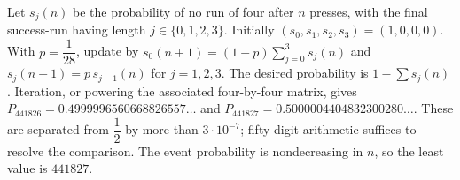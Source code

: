 Let $s_j(n)$ be the probability of no run of four after $n$ presses, with the final success-run having length $j\in\{0,1,2,3\}$. Initially $(s_0,s_1,s_2,s_3)=(1,0,0,0)$. With $p=\dfrac{1}{28}$, update by $s_0(n+1)=(1-p)\sum_{j=0}^3s_j(n)$ and $s_j(n+1)=p\,s_{j-1}(n)$ for $j=1,2,3$. The desired probability is $1-\sum s_j(n)$. Iteration, or powering the associated four-by-four matrix, gives $P_{441826}=0.4999996560668826557\ldots$ and $P_{441827}=0.5000004404832300280\ldots$. These are separated from $\dfrac{1}{2}$ by more than $3\cdot10^{-7}$; fifty-digit arithmetic suffices to resolve the comparison. The event probability is nondecreasing in $n$, so the least value is $\boxed{441827}$.
